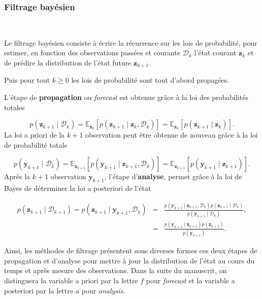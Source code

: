 \subsubsection{Filtrage bayésien}~\label{filtrage_bayesien}

Le filtrage bayésien consiste à écrire la récurrence sur les lois de probabilité, pour estimer, en fonction des observations passées et courante $\mathcal D_k$ l'état courant $\bm z_k$ et de prédire la distribution de l'état future $\bm z_{k+1}$.

Puis pour tout $k \geq 0$ les lois de probabilité sont tout d'abord propagées.

L'étape de \textbf{propagation} ou \textit{forecast} est obtenue grâce à la loi des probabilités totales

\begin{equation*}
    p(\bm z_{k+1} \mid \mathcal D_k) = \mathbb{E}_{\bm z_k}\left[p(\bm z_{k+1} \mid  \bm z_k,\mathcal{D}_k) \right] = \mathbb{E}_{\bm z_k}\left[p(\bm z_{k+1} \mid \bm z_k)\right].
\end{equation*}La loi a priori de la $k+1$ observation peut être obtenue de nouveau grâce à la loi de probabilité totale

\begin{equation*}
    p(\bm y_{k+1} \mid \mathcal D_k) = \mathbb{E}_{\bm{z}_{k+1}}\left[p(\bm y_{k+1}\mid \bm z_{k+1},\mathcal D_k)\right] = \mathbb{E}_{\bm{z}_{k+1}}\left[p(\bm y_{k+1}\mid \bm z_{k+1})\right].
\end{equation*}Après la $k+1$ observation $\bm y_{k+1}$, l'étape d'\textbf{analyse}, permet grâce à la loi de Bayes de déterminer la loi a posteriori de l'état

\begin{eqnarray*}
    p(\bm z_{k+1} \mid \mathcal D_{k+1}) = p(\bm z_{k+1} \mid \bm y_{k+1}, \mathcal D_{k})  &=& \frac{p(\bm y_{k+1} \mid \bm z_{k+1} ,\mathcal D_k)  p(\bm z_{k+1}\mid \mathcal D_k)}{p(\bm y_{k+1}\mid \mathcal D_k)}, \\
    &=& \frac{p(\bm y_{k+1} \mid \bm z_{k+1})  p(\bm z_{k+1})}{p(\bm y_{k+1})}.
\end{eqnarray*}

Ainsi, les méthodes de filtrage présentent sous diverses formes ces deux étapes de propagation et d'analyse pour mettre à jour la distribution de l'état au cours du temps et après mesure des observations. Dans la suite du manuscrit, on distinguera la variable a priori par la lettre $f$ pour \textit{forecast} et la variable a posteriori par la lettre $a$ pour \textit{analysis}.

